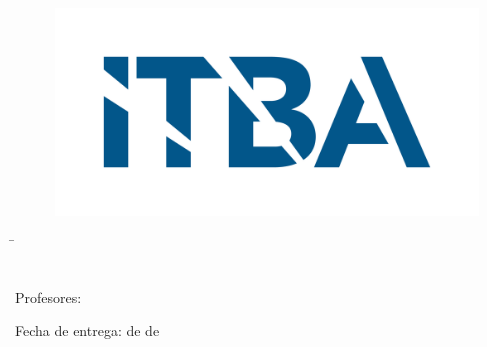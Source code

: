 

\begin{titlepage}
    \begin{figure}[t!]
    \centering
    \includegraphics[scale=0.1]{Imagenes/LOGO ITBA.png}
    \end{figure}
    
    \centering
    {\large{\the\materia}\par}
    \vspace{0.3cm}
    {\bfseries\Huge{\the\titulo}\par}
    \vspace{0.5cm}
    {\huge{\the\nombreTP}\par}
    \vspace{.5cm}
    {\large{\the\grupo}\par}
    \vspace{2cm}
    {\large{ \slshape
    \begin{tabbing}

        \the\nomEstudianteA \quad\quad\quad\= \the\legajoEstudianteA \quad\quad\= \href{mailto:	\the\mailEstudianteA}{\texttt{\the\mailEstudianteA}} \\
        \\
        \the\nomEstudianteB \> \the\legajoEstudianteB \> \href{mailto:	\the\mailEstudianteA}{\texttt{\the\mailEstudianteB}} 

    \end{tabbing}
    }\par}
 
    \vspace{4cm}
    {\large{Profesores: \the\profesores}\par}
    {\large{Fecha de entrega: \the\dia \space de \the\mes \space de \the\ano}\par}
    
\end{titlepage}
